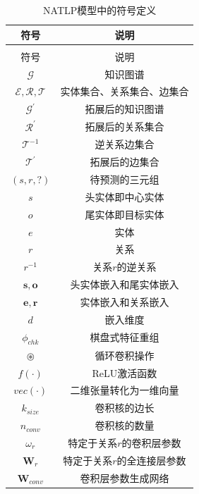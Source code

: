 \renewcommand\arraystretch{1.2}
\begin{longtable}[htbp]{cc}
  \caption{NATLP模型中的符号定义}
  \label{definition}\\
  \toprule
  符号  & 说明\\
  \midrule
  \endfirsthead
  \caption{NATLP模型中的符号定义}\\
  \toprule
  符号  & 说明 \\
  \midrule
  \endhead
  \hline
  \endfoot
  \bottomrule
  \endlastfoot
  
  $\mathcal{G}$   &   知识图谱      \\
  $\mathcal{E}, \mathcal{R}, \mathcal{T}$   &   实体集合、关系集合、边集合      \\
  $\mathcal{G}^\prime$  &  拓展后的知识图谱      \\
  $\mathcal{R}^{\prime}$   &   拓展后的关系集合      \\
  $\mathcal{T}^{-1}$   &   逆关系边集合      \\
  $\mathcal{T}^{\prime}$   &   拓展后的边集合      \\
  $(s,r,?)$  &   待预测的三元组      \\
  $s$   &   头实体即中心实体      \\
  $o$   &   尾实体即目标实体      \\
  $e$   &   实体      \\
  $r$   &   关系      \\
  $r^{-1}$   &   关系$r$的逆关系      \\
  $\boldsymbol{s},\boldsymbol{o}$ & 头实体嵌入和尾实体嵌入\\
  $\boldsymbol{e},\boldsymbol{r}$ & 实体嵌入和关系嵌入\\
  $d$ &嵌入维度\\
  $\phi_{chk}$ & 棋盘式特征重组\\
  $\circledast$ & 循环卷积操作\\
  $f(\cdot )$ & ReLU激活函数\\
  $vec(\cdot)$ & 二维张量转化为一维向量\\
  $k_{size}$ &卷积核的边长\\
  $n_{conv}$ &卷积核的数量\\
  $\omega_r$ & 特定于关系$r$的卷积层参数\\
  $\mathbf{W}_r$ &特定于关系$r$的全连接层参数\\
  $\mathbf{W}_{conv}$ & 卷积层参数生成网络\\

\end{longtable}

